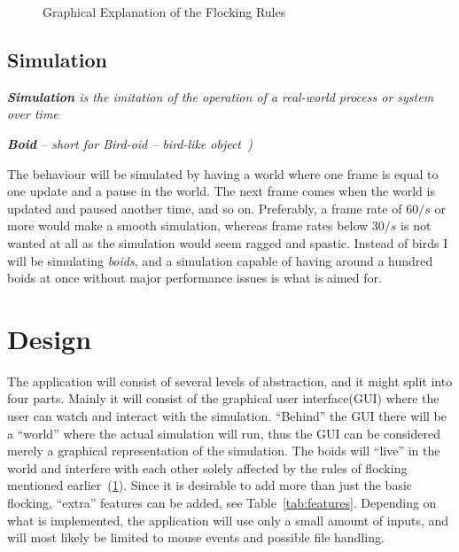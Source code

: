 \documentclass[a4paper,twoside, 10pt]{report}
\begin{document}
\begin{figure}[H]
  \abovecaptionskip
  \belowcaptionskip
  \caption{Graphical Explanation of the Flocking Rules~\cite{reynolds87behavioral, unknown15flockingrules}}
  \label{fig:rules}
\end{figure}

\subsection{Simulation
\label{subsec:simulation}}

\begin{description}
	\item \textit{\textbf{Simulation} is the imitation of the operation of a real-world process or system over time~\cite{wiki15simulation}}
    \item \textit{\textbf{Boid} -- short for Bird-oid -- bird-like object~\cite{wiki15Boids})}
\end{description}

The behaviour will be simulated by having a world where one frame is equal to one update and a pause in the world. The next frame comes when the world is updated and paused another time, and so on. Preferably, a frame rate of 60$/s$ or more would make a smooth simulation, whereas frame rates below 30$/s$ is not wanted at all as the simulation would seem ragged and spastic. Instead of birds I will be simulating \textit{boids}, and a simulation capable of having around a hundred boids at once without major performance issues is what is aimed for.




\section{Design}
\label{sec:design}
The application will consist of several levels of abstraction, and it might split into four parts. Mainly it will consist of the graphical user interface(GUI) where the user can watch and interact with the simulation. ``Behind'' the GUI there will be a ``world'' where the actual simulation will run, thus the GUI can be considered merely a graphical representation of the simulation. The boids will ``live'' in the world and interfere with each other solely affected by the rules of flocking mentioned earlier~(\ref{fig:rules}). Since it is desirable to add more than just the basic flocking, ``extra'' features can be added, see Table~\ref{tab:features}. Depending on what is implemented, the application will use only a small amount of inputs, and will most likely be limited to mouse events and possible file handling. 
\end{document}
